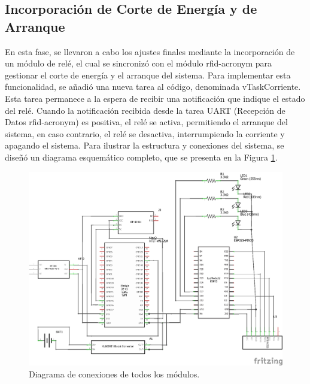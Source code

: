 \subsection{ Incorporación de Corte de Energía y de Arranque}

En esta fase, se llevaron a cabo los ajustes finales mediante la incorporación de un módulo de relé, el cual se sincronizó con el módulo \acrshort{rfid-acronym} para gestionar el corte de energía y el arranque del sistema. Para implementar esta funcionalidad, se añadió una nueva tarea al código, denominada vTaskCorriente. Esta tarea permanece a la espera de recibir una notificación que indique el estado del relé. Cuando la notificación recibida desde la tarea UART (Recepción de Datos \acrshort{rfid-acronym}) es positiva, el relé se activa, permitiendo el arranque del sistema, en caso contrario, el relé se desactiva, interrumpiendo la corriente y apagando el sistema. Para ilustrar la estructura y conexiones del sistema, se diseñó un diagrama esquemático completo, que se presenta en la Figura \ref{fig:diagramacompleto}.

\begin{figure}[H]
\leavevmode
\begin{minipage}{\textwidth}
\begin{center}
\includegraphics[width=\textwidth]{./capitulo_04/imagen/diagramacompleto.png}
\caption{Diagrama de conexiones de todos los módulos.\label{fig:diagramacompleto}}
\end{center}
\end{minipage}
\end{figure}

